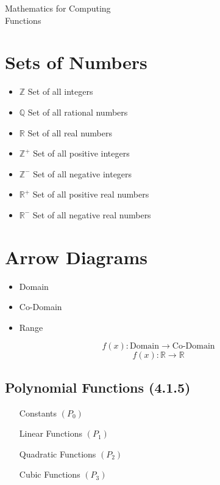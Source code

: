 \documentclass[12pt]{article}
\begin{document}
\begin{center}
\huge{Mathematics for Computing}\\
\LARGE{Functions}
\end{center}
\tableofcontents
\newpage
\section{Sets of Numbers}

\begin{itemize}
\item $\mathbb{Z}$ Set of all integers
\item $\mathbb{Q}$ Set of all rational numbers
\item $\mathbb{R}$ Set of all real numbers
\end{itemize}


\begin{itemize}
\item $\mathbb{Z}^{+}$ Set of all positive integers
\item $\mathbb{Z}^{-}$ Set of all negative integers
\item $\mathbb{R}^{+}$ Set of all positive real numbers
\item $\mathbb{R}^{-}$ Set of all negative real numbers
\end{itemize}

\section{Arrow Diagrams}

\begin{itemize}

\item Domain
\item Co-Domain
\item Range
\end{itemize}
\[  f(x) : \mbox{Domain} \rightarrow \mbox{Co-Domain} \]
\[  f(x) : \mathbb{R} \rightarrow \mathbb{R} \]
\newpage
\subsection*{Polynomial Functions (4.1.5)}

\begin{itemize}
\item[Constants] $(P_0)$
\item[Linear Functions] $(P_1)$
\item[Quadratic Functions] $(P_2)$
\item[Cubic Functions] $(P_3)$
\end{itemize}
\end{document}
